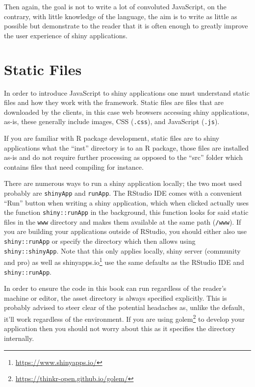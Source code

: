 \documentclass[
]{krantz}
\renewcommand{\href}[2]{#2\footnote{\url{#1}}}
\begin{document}
Then again, the goal is not to write a lot of convoluted JavaScript, on the contrary, with little knowledge of the language, the aim is to write as little as possible but demonstrate to the reader that it is often enough to greatly improve the user experience of shiny applications.

\hypertarget{static-files}{%
\section*{Static Files}\label{static-files}}


In order to introduce JavaScript to shiny applications one must understand static files and how they work with the framework. Static files are files that are downloaded by the clients, in this case web browsers accessing shiny applications, as-is, these generally include images, CSS (\texttt{.css}), and JavaScript (\texttt{.js}).

If you are familiar with R package development, static files are to shiny applications what the ``inst'' directory is to an R package, those files are installed as-is and do not require further processing as opposed to the ``src'' folder which contains files that need compiling for instance.

There are numerous ways to run a shiny application locally; the two most used probably are \texttt{shinyApp} and \texttt{runApp}. The RStudio IDE comes with a convenient ``Run'' button when writing a shiny application, which when clicked actually uses the function \texttt{shiny::runApp} in the background, this function looks for said static files in the \texttt{www} directory and makes them available at the same path (\texttt{/www}). If you are building your applications outside of RStudio, you should either also use \texttt{shiny::runApp} or specify the directory which then allows using \texttt{shiny::shinyApp}. Note that this only applies locally, shiny server (community and pro) as well as \href{https://www.shinyapps.io/}{shinyapps.io} use the same defaults as the RStudio IDE and \texttt{shiny::runApp}.

In order to ensure the code in this book can run regardless of the reader's machine or editor, the asset directory is always specified explicitly. This is probably advised to steer clear of the potential headaches as, unlike the default, it'll work regardless of the environment. If you are using \href{https://thinkr-open.github.io/golem/}{golem} \citep{R-golem} to develop your application then you should not worry about this as it specifies the directory internally.
\end{document}
